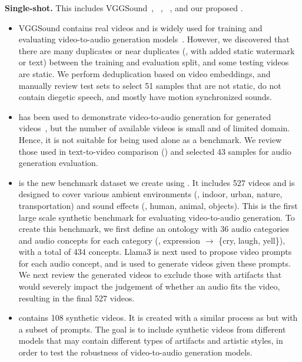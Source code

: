 \noindent\textbf{Single-shot.}
This includes VGGSound~\citep{vggsound}, \Sora~\citep{sora}, \RunwayGen~\citep{gen3}, and our proposed \OursAudioBench.
\begin{itemize}
    \item VGGSound contains real videos and is widely used for training and evaluating video-to-audio generation models~\citep{mei2023foleygen, luo2024diff, xing2024seeing}.
    However, we discovered that there are many duplicates or near duplicates (\eg, with added static watermark or text) between the training and evaluation split,
    and some testing videos are static.
    We perform deduplication based on video embeddings, and manually review test sets to select 51 samples that are not static, do not contain diegetic speech, and mostly have motion synchronized sounds.
    \item \Sora has been used to demonstrate video-to-audio generation for generated videos~\citep{xing2024seeing,mei2023foleygen}, but the number of available videos is small and of limited domain.
    Hence, it is not suitable for being used alone as a benchmark.
    We review those used in text-to-video comparison () and selected 43 samples for audio generation evaluation.
    \item \OursAudioBench is the new benchmark dataset we create using \OursVideo.
    It includes 527 videos and is designed to cover various ambient environments (\eg, indoor, urban, nature, transportation) and sound effects (\eg, human, animal, objects).
    This is the first large scale synthetic benchmark for evaluating video-to-audio generation.
    To create this benchmark, we first define an ontology with 36 audio categories and audio concepts for each category (\eg, expression $\rightarrow$ \{cry, laugh, yell\}), with a total of 434 concepts.
    Llama3 is next used to propose video prompts for each audio concept,
    and \OursVideo is used to generate videos given these prompts.
    We next review the generated videos to exclude those with artifacts that would severely impact the judgement of whether an audio fits the video, resulting in the final 527 videos.
    \item \RunwayGen contains 108 synthetic videos.
    It is created with a similar process as \OursAudioBench but with a subset of prompts.
    The goal is to include synthetic videos from different models that may contain different types of artifacts and artistic styles, in order to test the robustness of video-to-audio generation models.
\end{itemize}

